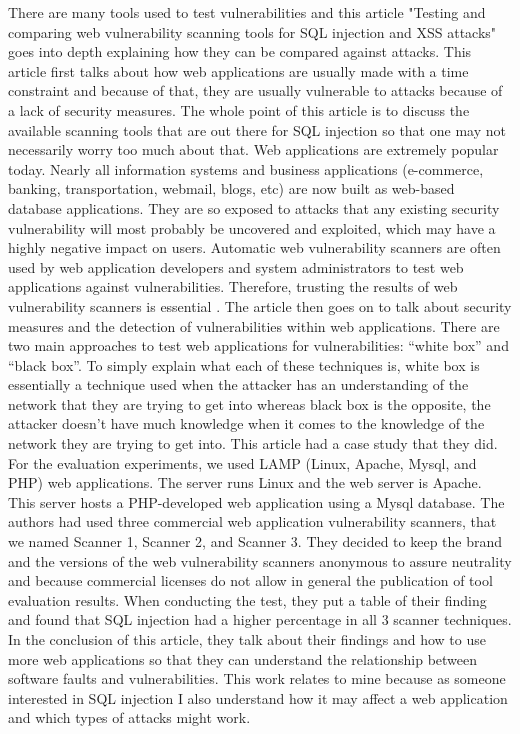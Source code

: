 There are many tools used to test vulnerabilities and this article "Testing and comparing web vulnerability scanning tools for SQL injection and XSS attacks" goes into depth explaining how they can be compared against attacks. This article first talks about how web applications are usually made with a time constraint and because of that, they are usually vulnerable to attacks because of a lack of security measures. The whole point of this article is to discuss the available scanning tools that are out there for SQL injection so that one may not necessarily worry too much about that. Web applications are extremely popular today. Nearly all information systems and business applications (e-commerce, banking, transportation, webmail, blogs, etc) are now built as web-based database applications. They are so exposed to attacks that any existing security vulnerability will most probably be uncovered and exploited, which may have a highly negative impact on users. Automatic web vulnerability scanners are often used by web application developers and system administrators to test web applications against vulnerabilities. Therefore, trusting the results of web vulnerability scanners is essential \cite{fonseca2007testing}.
The article then goes on to talk about security measures and the detection of vulnerabilities within web applications. There are two main approaches to test web applications for vulnerabilities: “white box” and “black box”. To simply explain what each of these techniques is, white box is essentially a technique used when the attacker has an understanding of the network that they are trying to get into whereas black box is the opposite, the attacker doesn't have much knowledge when it comes to the knowledge of the network they are trying to get into. This article had a case study that they did. For the evaluation experiments, we used LAMP (Linux, Apache, Mysql, and PHP) web applications. The server runs Linux and the web server is Apache. This server hosts a PHP-developed web application using a Mysql database. The authors had used three commercial web application vulnerability scanners, that we named Scanner 1, Scanner 2, and Scanner 3. They decided to keep the brand and the versions of the web vulnerability scanners anonymous to assure neutrality and because commercial licenses do not allow in general the publication of tool evaluation results. When conducting the test, they put a table of their finding and found that SQL injection had a higher percentage in all 3 scanner techniques. In the conclusion of this article, they talk about their findings and how to use more web applications so that they can understand the relationship between software faults and vulnerabilities. This work relates to mine because as someone interested in SQL injection I also understand how it may affect a web application and which types of attacks might work.



